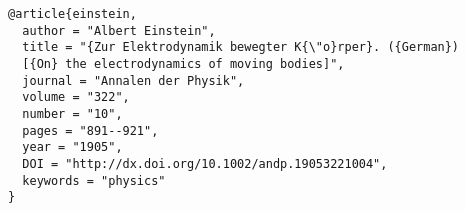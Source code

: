 \documentclass{article}
\begin{document}
\begin{verbatim}
@article{einstein,
  author = "Albert Einstein",
  title = "{Zur Elektrodynamik bewegter K{\"o}rper}. ({German})
  [{On} the electrodynamics of moving bodies]",
  journal = "Annalen der Physik",
  volume = "322",
  number = "10",
  pages = "891--921",
  year = "1905",
  DOI = "http://dx.doi.org/10.1002/andp.19053221004",
  keywords = "physics"
}
\end{verbatim}


\end{document}

